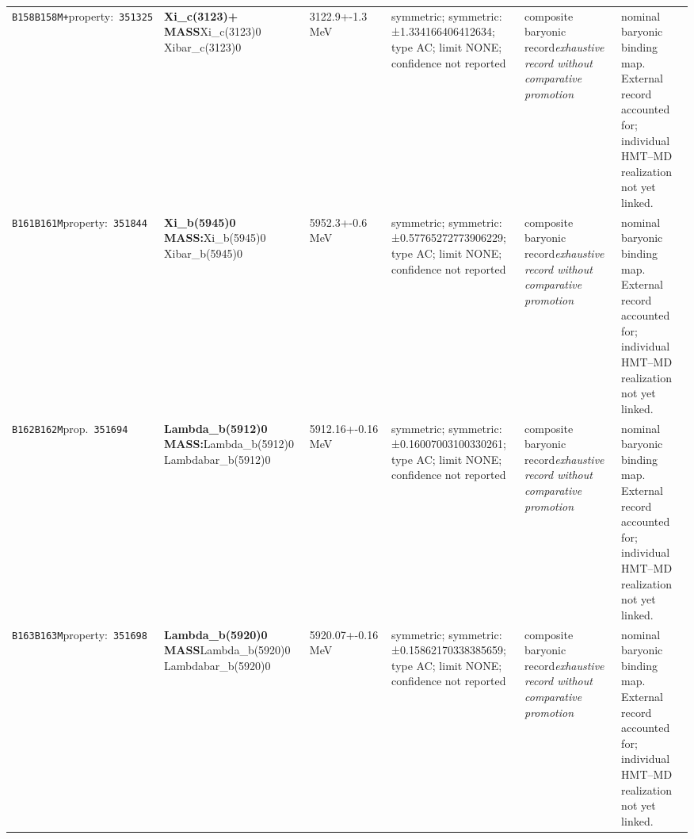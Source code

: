 \begin{landscape}
\begin{longtable}{L{1.85cm}L{4.45cm}L{2.35cm}L{4.05cm}L{3.35cm}L{7.15cm}}
\texttt{B158}\newline \texttt{B158M+}\newline property:\ \texttt{351325} & \textbf{Xi\_\allowbreak{}c(3123)+ MASS}\newline Xi\_\allowbreak{}c(3123)0 \textbar{}\allowbreak{} Xibar\_\allowbreak{}c(3123)0 & 3122.9+-1.3\,MeV & symmetric; symmetric: ±1.334166406412634; type AC; limit NONE; confidence not reported & composite baryonic record\newline \emph{exhaustive record without comparative promotion} & nominal baryonic binding map. External record accounted for; individual HMT--MD realization not yet linked. \\
\texttt{B161}\newline \texttt{B161M}\newline property:\ \texttt{351844} & \textbf{Xi\_\allowbreak{}b(5945)0 MASS:}\newline Xi\_\allowbreak{}b(5945)0 \textbar{}\allowbreak{} Xibar\_\allowbreak{}b(5945)0 & 5952.3+-0.6\,MeV & symmetric; symmetric: ±0.57765272773906229; type AC; limit NONE; confidence not reported & composite baryonic record\newline \emph{exhaustive record without comparative promotion} & nominal baryonic binding map. External record accounted for; individual HMT--MD realization not yet linked. \\
\texttt{B162}\newline \texttt{B162M}\newline prop.\ \texttt{351694} & \textbf{Lambda\_\allowbreak{}b(5912)0 MASS:}\newline Lambda\_\allowbreak{}b(5912)0 \textbar{}\allowbreak{} Lambdabar\_\allowbreak{}b(5912)0 & 5912.16+-0.16\,MeV & symmetric; symmetric: ±0.16007003100330261; type AC; limit NONE; confidence not reported & composite baryonic record\newline \emph{exhaustive record without comparative promotion} & nominal baryonic binding map. External record accounted for; individual HMT--MD realization not yet linked. \\
\texttt{B163}\newline \texttt{B163M}\newline property:\ \texttt{351698} & \textbf{Lambda\_\allowbreak{}b(5920)0 MASS}\newline Lambda\_\allowbreak{}b(5920)0 \textbar{}\allowbreak{} Lambdabar\_\allowbreak{}b(5920)0 & 5920.07+-0.16\,MeV & symmetric; symmetric: ±0.15862170338385659; type AC; limit NONE; confidence not reported & composite baryonic record\newline \emph{exhaustive record without comparative promotion} & nominal baryonic binding map. External record accounted for; individual HMT--MD realization not yet linked. \\

\end{longtable}
\end{landscape}
